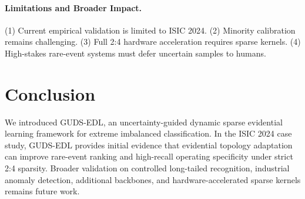 \documentclass[letterpaper]{article} %
\begin{document}
\paragraph{Limitations and Broader Impact.} (1) Current empirical validation is limited to ISIC 2024. (2) Minority calibration remains challenging. (3) Full 2:4 hardware acceleration requires sparse kernels. (4) High-stakes rare-event systems must defer uncertain samples to humans.

\section{Conclusion}
We introduced GUDS-EDL, an uncertainty-guided dynamic sparse evidential learning framework for extreme imbalanced classification. In the ISIC 2024 case study, GUDS-EDL provides initial evidence that evidential topology adaptation can improve rare-event ranking and high-recall operating specificity under strict 2:4 sparsity. Broader validation on controlled long-tailed recognition, industrial anomaly detection, additional backbones, and hardware-accelerated sparse kernels remains future work.
\end{document}
